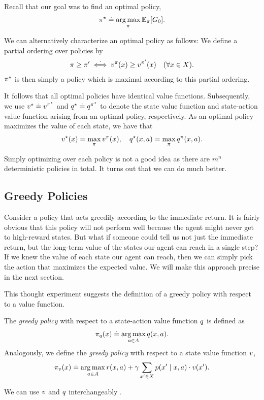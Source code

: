 Recall that our goal was to find an optimal policy, \begin{align}
  \pis \defeq \argmax_\pi \E[\pi]{G_0}.
\end{align}

We can alternatively characterize an optimal policy as follows: We define a partial ordering over policies by \begin{align}
  \pi \geq \pi' \overset{\cdot}{\iff} \v[\pi]{x} \geq \v[\pi']{x} \quad (\forall x \in \sX).
\end{align}
$\pi^\star$ is then simply a policy which is maximal according to this partial ordering.

It follows that all optimal policies have identical value functions.
Subsequently, we use $\fnv[\star] \defeq \fnv[\pis]$ and $\fnq[\star] \defeq \fnq[\pis]$ to denote the state value function and state-action value function arising from an optimal policy, respectively.
As an optimal policy maximizes the value of each state, we have that \begin{align}
  \v*{x} = \max_\pi \v[\pi]{x}, \quad \q*{x}{a} = \max_\pi \q[\pi]{x}{a}. \label{eq:opt_q_function}
\end{align}

Simply optimizing over each policy is not a good idea as there are $m^n$ deterministic policies in total.
It turns out that we can do much better.

\subsection{Greedy Policies}

Consider a policy that acts greedily according to the immediate return.
It is fairly obvious that this policy will not perform well because the agent might never get to high-reward states.
But what if someone could tell us not just the immediate return, but the long-term value of the states our agent can reach in a single step?
If we knew the value of each state our agent can reach, then we can simply pick the action that maximizes the expected value.
We will make this approach precise in the next section.

This thought experiment suggests the definition of a greedy policy with respect to a value function.

\begin{defn}
  The \emph{greedy policy} with respect to a state-action value function $\fnq$ is defined as \begin{align}
    \pi_{\fnq}(x) \defeq \argmax_{a \in \sA} \q{x}{a}. \label{eq:greedy_policy1}
  \end{align}
  Analogously, we define the \emph{greedy policy} with respect to a state value function $\fnv$, \begin{align}
    \pi_{\fnv}(x) \defeq \argmax_{a \in \sA} r(x, a) + \gamma \sum_{x' \in \sX} p(x' \mid x, a) \cdot \v{x'}. \label{eq:greedy_policy2}
  \end{align}
\end{defn}
We can use $\fnv$ and $\fnq$ interchangeably .

